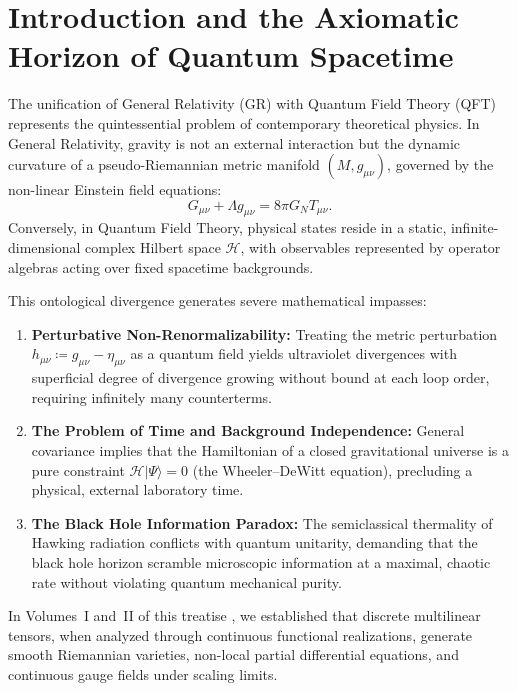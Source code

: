 \documentclass[11pt,a4paper,reqno]{amsart}
\theoremstyle{definition}
\numberwithin{equation}{section}
\begin{document}
\section{Introduction and the Axiomatic Horizon of Quantum Spacetime}
\label{sec:intro}

The unification of General Relativity (GR) with Quantum Field Theory (QFT) represents the quintessential problem of contemporary theoretical physics. In General Relativity, gravity is not an external interaction but the dynamic curvature of a pseudo-Riemannian metric manifold $(M, g_{\mu\nu})$, governed by the non-linear Einstein field equations:
\begin{equation}
    \label{eq:einstein_classical}
    G_{\mu\nu} + \Lambda g_{\mu\nu} = 8\pi G_N T_{\mu\nu}.
\end{equation}
Conversely, in Quantum Field Theory, physical states reside in a static, infinite-dimensional complex Hilbert space $\mathscr{H}$, with observables represented by operator algebras acting over fixed spacetime backgrounds.

This ontological divergence generates severe mathematical impasses:
\begin{enumerate}[label=(\roman*)]
    \item \textbf{Perturbative Non-Renormalizability:} Treating the metric perturbation $h_{\mu\nu} \coloneqq g_{\mu\nu} - \eta_{\mu\nu}$ as a quantum field yields ultraviolet divergences with superficial degree of divergence growing without bound at each loop order, requiring infinitely many counterterms.
    \item \textbf{The Problem of Time and Background Independence:} General covariance implies that the Hamiltonian of a closed gravitational universe is a pure constraint $\mathcal{H} |\Psi\rangle = 0$ (the Wheeler--DeWitt equation), precluding a physical, external laboratory time.
    \item \textbf{The Black Hole Information Paradox:} The semiclassical thermality of Hawking radiation conflicts with quantum unitarity, demanding that the black hole horizon scramble microscopic information at a maximal, chaotic rate without violating quantum mechanical purity.
\end{enumerate}

In Volumes~I and~II of this treatise \cite{turing2026beyond, turing2026flows}, we established that discrete multilinear tensors, when analyzed through continuous functional realizations, generate smooth Riemannian varieties, non-local partial differential equations, and continuous gauge fields under scaling limits. 
\end{document}
